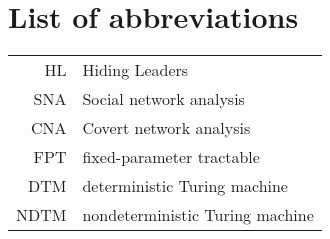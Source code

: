 \documentclass[english,bachelor,unicode]{ctufit-thesis}
\theoremstyle{plain}
\theoremstyle{definition}
\theoremstyle{remark}
\numberwithin{theorem}{chapter}
\begin{document}
\printabstractpage %


\chapter{List of abbreviations}

\begin{tabular}{rl}
HL & Hiding Leaders\\
SNA & Social network analysis\\
CNA & Covert network analysis\\
FPT & fixed-parameter tractable\\
DTM & deterministic Turing machine\\
NDTM & nondeterministic Turing machine
\end{tabular}


\mainmatter\mainmatterinit %







%
%

\appendix\appendixinit %


\backmatter %

\printbibliography %

\end{document}

